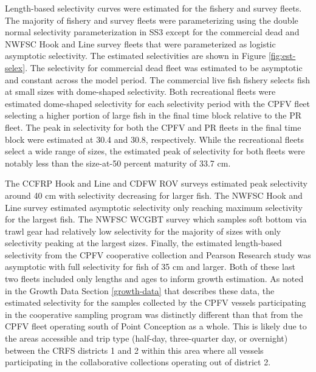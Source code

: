 \documentclass[11pt,
  english,
  letterpaper,
]{article}
\begin{document}
Length-based selectivity curves were estimated for the fishery and survey fleets. The majority of fishery and survey fleets were parameterizing using the double normal selectivity parameterization in SS3 except for the commercial dead and NWFSC Hook and Line survey fleets that were parameterized as logistic asymptotic selectivity. The estimated selectivities are shown in Figure \ref{fig:est-selex}. The selectivity for commercial dead fleet was estimated to be asymptotic and constant across the model period. The commercial live fish fishery selects fish at small sizes with dome-shaped selectivity. Both recreational fleets were estimated dome-shaped selectivity for each selectivity period with the CPFV fleet selecting a higher portion of large fish in the final time block relative to the PR fleet. The peak in selectivity for both the CPFV and PR fleets in the final time block were estimated at 30.4 and 30.8, respectively. While the recreational fleets select a wide range of sizes, the estimated peak of selectivity for both fleets were notably less than the size-at-50 percent maturity of 33.7 cm.

The CCFRP Hook and Line and CDFW ROV surveys estimated peak selectivity around 40 cm with selectivity decreasing for larger fish. The NWFSC Hook and Line survey estimated asymptotic selectivity only reaching maximum selectivity for the largest fish. The NWFSC WCGBT survey which samples soft bottom via trawl gear had relatively low selectivity for the majority of sizes with only selectivity peaking at the largest sizes. Finally, the estimated length-based selectivity from the CPFV cooperative collection and Pearson Research study was asymptotic with full selectivity for fish of 35 cm and larger. Both of these last two fleets included only lengths and ages to inform growth estimation. As noted in the Growth Data Section \ref{growth-data} that describes these data, the estimated selectivity for the samples collected by the CPFV vessels participating in the cooperative sampling program was distinctly different than that from the CPFV fleet operating south of Point Conception as a whole. This is likely due to the areas accessible and trip type (half-day, three-quarter day, or overnight) between the CRFS districts 1 and 2 within this area where all vessels participating in the collaborative collections operating out of district 2.
\end{document}
